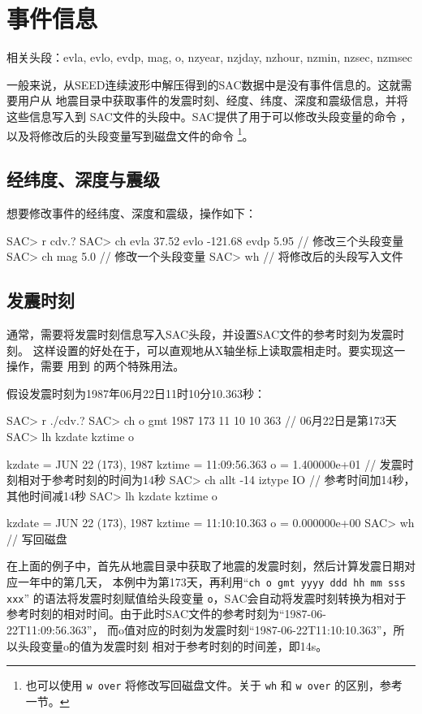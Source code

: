 \section{事件信息}
\label{sec:event-info}
相关头段：evla, evlo, evdp, mag, o, nzyear, nzjday, nzhour, nzmin, nzsec, nzmsec

一般来说，从SEED连续波形中解压得到的SAC数据中是没有事件信息的。这就需要用户从
地震目录中获取事件的发震时刻、经度、纬度、深度和震级信息，并将这些信息写入到
SAC文件的头段中。SAC提供了用于可以修改头段变量的命令 ，
以及将修改后的头段变量写到磁盘文件的命令 
\footnote{
也可以使用 \texttt{w over} 将修改写回磁盘文件。关于 \texttt{wh} 和
\texttt{w over} 的区别，参考  一节。}。

\subsection{经纬度、深度与震级}
想要修改事件的经纬度、深度和震级，操作如下：
\begin{SACCode}
SAC> r cdv.?
SAC> ch evla 37.52 evlo -121.68 evdp 5.95   // 修改三个头段变量
SAC> ch mag 5.0                             // 修改一个头段变量
SAC> wh                                     // 将修改后的头段写入文件
\end{SACCode}

\subsection{发震时刻}
通常，需要将发震时刻信息写入SAC头段，并设置SAC文件的参考时刻为发震时刻。
这样设置的好处在于，可以直观地从X轴坐标上读取震相走时。要实现这一操作，需要
用到  的两个特殊用法。

假设发震时刻为1987年06月22日11时10分10.363秒：
\label{code:origin-time}
\begin{SACCode}
SAC> r ./cdv.?
SAC> ch o gmt 1987 173 11 10 10 363   // 06月22日是第173天
SAC> lh kzdate kztime o

     kzdate = JUN 22 (173), 1987
     kztime = 11:09:56.363
          o = 1.400000e+01       // 发震时刻相对于参考时刻的时间为14秒
SAC> ch allt -14 iztype IO       // 参考时间加14秒，其他时间减14秒
SAC> lh kzdate kztime o

     kzdate = JUN 22 (173), 1987
     kztime = 11:10:10.363
          o = 0.000000e+00
SAC> wh                          // 写回磁盘
\end{SACCode}

在上面的例子中，首先从地震目录中获取了地震的发震时刻，然后计算发震日期对应一年中的第几天，
本例中为第173天，再利用``\texttt{ch o gmt yyyy ddd hh mm sss xxx}''
的语法将发震时刻赋值给头段变量 \texttt{o}，SAC会自动将发震时刻转换为相对于
参考时刻的相对时间。由于此时SAC文件的参考时刻为``1987-06-22T11:09:56.363''，
而o值对应的时刻为发震时刻``1987-06-22T11:10:10.363''，所以头段变量o的值为发震时刻
相对于参考时刻的时间差，即14s。


